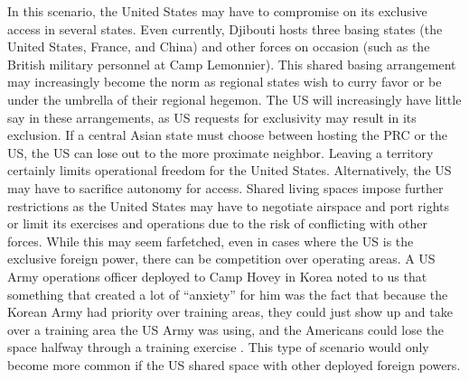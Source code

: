 In this scenario, the United States may have to compromise on its exclusive access in several states. Even currently, Djibouti hosts three basing states (the United States, France, and China) and other forces on occasion (such as the British military personnel at Camp Lemonnier). This shared basing arrangement may increasingly become the norm as regional states wish to curry favor or be under the umbrella of their regional hegemon. The US will increasingly have little say in these arrangements, as US requests for exclusivity may result in its exclusion. If a central Asian state must choose between hosting the PRC or the US, the US can lose out to the more proximate neighbor. Leaving a territory certainly limits operational freedom for the United States. Alternatively, the US may have to sacrifice autonomy for access. Shared living spaces impose further restrictions as the United States may have to negotiate airspace and port rights or limit its exercises and operations due to the risk of conflicting with other forces. While this may seem farfetched, even in cases where the US is the exclusive foreign power, there can be competition over operating areas. A US Army operations officer deployed to Camp Hovey in Korea noted to us that something that created a lot of ``anxiety'' for him was the fact that because the Korean Army had priority over training areas, they could just show up and take over a training area the US Army was using, and the Americans could lose the space halfway through a training exercise \cite{koreaone20210926}. This type of scenario would only become more common if the US shared space with other deployed foreign powers.  

